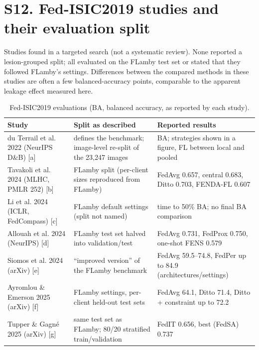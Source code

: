 \documentclass[10pt]{article}
\begin{document}
\section*{S12. Fed-ISIC2019 studies and their evaluation split}
Studies found in a targeted search (not a systematic review). None reported a lesion-grouped split; all evaluated on the FLamby test set or stated that they followed FLamby's settings. Differences between the compared methods in these studies are often a few balanced-accuracy points, comparable to the apparent leakage effect measured here.
\begin{table}[!htbp]
\centering
\scriptsize
\caption{Fed-ISIC2019 evaluations (BA, balanced accuracy, as reported by each study).}
\label{tab:s13}
\begin{tabular}{@{}p{4.2cm}p{5.0cm}p{6.3cm}@{}}
\toprule
Study & Split as described & Reported results \\
\midrule
du Terrail et al. 2022 (NeurIPS D\&B) [a] & defines the benchmark; image-level re-split of the 23,247 images & BA; strategies shown in a figure, FL between local and pooled \\
Tavakoli et al. 2024 (MLHC, PMLR 252) [b] & FLamby split (per-client sizes reproduced from FLamby) & FedAvg 0.657, central 0.683, Ditto 0.703, FENDA-FL 0.607 \\
Li et al. 2024 (ICLR, FedCompass) [c] & FLamby default settings (split not named) & time to 50\% BA; no final BA comparison \\
Allouah et al. 2024 (NeurIPS) [d] & FLamby test set halved into validation/test & FedAvg 0.731, FedProx 0.750, one-shot FENS 0.579 \\
Siomos et al. 2024 (arXiv) [e] & ``improved version'' of the FLamby benchmark & FedAvg 59.5--74.8, FedPer up to 84.9 (architectures/settings) \\
Ayromlou \& Emerson 2025 (arXiv) [f] & FLamby settings, per-client held-out test sets & FedAvg 64.1, Ditto 71.4, Ditto + constraint up to 72.2 \\
Tupper \& Gagn\'e 2025 (arXiv) [g] & same test set as FLamby; 80/20 stratified train/validation & FedIT 0.656, best (FedSA) 0.737 \\
\bottomrule
\end{tabular}
\end{table}
\end{document}
